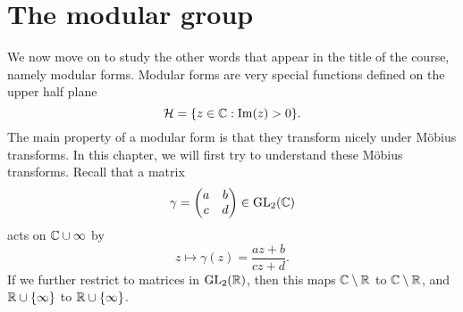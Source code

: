 \documentclass[a4paper]{article}
\renewcommand{\H}{\mathcal{H}}
\begin{document}
\section{The modular group}
We now move on to study the other words that appear in the title of the course, namely modular forms. Modular forms are very special functions defined on the upper half plane
\[
  \H = \{z \in \C: \Im (z) > 0\}.
\]
The main property of a modular form is that they transform nicely under M\"obius transforms. In this chapter, we will first try to understand these M\"obius transforms. Recall that a matrix
\[
  \gamma =
  \begin{pmatrix}
    a & b\\
    c & d
  \end{pmatrix} \in \mathrm{GL}_2(\mathbb{C})
\]
acts on $\mathbb{C}\cup \infty$ by
\[
  z \mapsto \gamma(z) = \frac{az + b}{cz + d}.
\]
If we further restrict to matrices in $\mathrm{GL}_2(\mathbb{R})$, then this maps $\mathbb{C} \setminus \mathbb{R}$ to $\mathbb{C} \setminus \mathbb{R}$, and $\mathbb{R} \cup \{\infty\}$ to $\mathbb{R} \cup \{\infty\}$.
\end{document}
